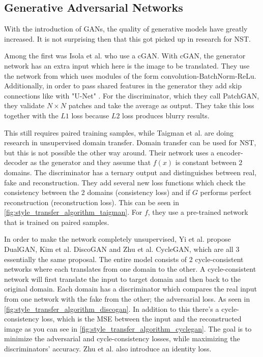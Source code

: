 \subsection{Generative Adversarial Networks}
With the introduction of \glspl{GAN}, the quality of generative models have greatly increased.
It is not surprising then that this got picked up in research for \gls{NST}.

Among the first was Isola et al. \cite{Isola2016} who use a \gls{cGAN}.
With \gls{cGAN}, the generator network has an extra input which here is the image to be translated.
They use the network from \cite{radford2016} which uses modules of the form convolution-BatchNorm-ReLu\cite{Ioffe2015}.
Additionally, in order to pass shared features in the generator they add skip connections like with "U-Net" \cite{Ronneberger2015}.
For the discriminator, which they call PatchGAN, they validate $N\times N$ patches and take the average as output.
They take this loss together with the $L1$ loss because $L2$ loss produces blurry results.

This still requires paired training samples, while Taigman et al. \cite{Taigman2016} are doing research in unsupervised domain transfer.
Domain transfer can be used for \gls{NST}, but this is not possible the other way around.
Their network uses a encoder-decoder as the generator and they assume that $f(x)$ is constant between 2 domains.
The discriminator has a ternary output and distinguishes between real, fake and reconstruction.
They add several new loss functions which check the consistency between the 2 domains (consistency loss) and if $G$ performs perfect reconstruction (reconstruction loss).
This can be seen in \ref{fig:style_transfer_algorithm_taigman}.
For $f$, they use a pre-trained network that is trained on paired samples.

In order to make the network completely unsupervised, Yi et al.\cite{Yi2017} propose DualGAN, Kim et al. \cite{Kim2017} DiscoGAN and Zhu et al. \cite{Zhu2017} CycleGAN, which are all 3 essentially the same proposal.
The entire model consists of 2 cycle-consistent networks where each translates from one domain to the other.
A cycle-consistent network will first translate the input to target domain and then back to the original domain.
Each domain has a discriminator which compares the real input from one network with the fake from the other; the adversarial loss. As seen in \ref{fig:style_transfer_algorithm_discogan}.
In addition to this there's a cycle-consistency loss, which is the \gls{MSE} between the input and the reconstructed image as you can see in \ref{fig:style_transfer_algorithm_cyclegan}.
The goal is to minimize the adversarial and cycle-consistency losses, while maximizing the discriminators' accuracy.
Zhu et al. \cite{Zhu2017} also introduce an identity loss.

